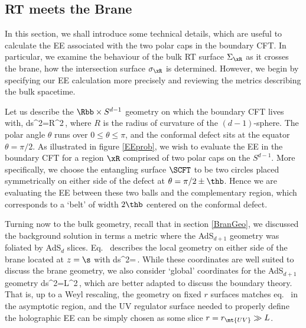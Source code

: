 \subsection{RT meets the Brane}
\label{sec:enzyme}
%
In this section, we shall introduce some technical details, which are useful to calculate the EE associated with the two polar caps in the boundary CFT. In particular, we examine the behaviour of the bulk RT surface $\Sigma_\xR$ as it crosses the brane, \ie how the intersection surface $\sigma_\xR$ is determined.
However, we begin by specifying our EE calculation more precisely and reviewing the metrics describing the bulk spacetime.

Let us describe the $\Rbb\times S^{d-1}$ geometry on which the boundary CFT lives with,
\beq\label{metricCFT}
ds^2=R^2\,,
\eeq
where $R$ is the radius of curvature of the $(d-1)$-sphere. The polar angle $\theta$ runs over $0\le\theta\le\pi$, and the conformal defect sits at the equator $\theta=\pi/2$. As illustrated in figure \ref{EEprob}, we wish to evaluate the EE in the boundary CFT for a region $\xR$ comprised of two polar caps on the $S^{d-1}$. More specifically, we choose the entangling surface $\SCFT$ to be two circles placed  symmetrically on either side of the defect at $\theta=\pi/2\pm\thb$. Hence we are evaluating the EE between these two balls and the complementary region, which corresponds to a `belt' of width $2\thb$ centered on the conformal defect.

Turning now to the bulk geometry, recall that in section \ref{BranGeo}, we discussed the background solution in terms a metric where the AdS$_{d+1}$ geometry was foliated by AdS$_d$ slices. Eq.~ describes the local geometry on either side of the brane
located at $z=\s$ with
\beq\label{metric3a}
ds^2=\,.
\eeq
While these coordinates are well suited to discuss the brane geometry, we also consider `global' coordinates for the AdS$_{d+1}$ geometry
\beq\label{metric2s}
ds^2=L^2\,,
\eeq
which are better adapted to discuss the boundary theory. That is, up to a Weyl rescaling, the geometry on fixed $r$ surfaces matches eq.~  in the asymptotic region, and the UV regulator surface needed to properly define the holographic EE can be simply chosen as some slice $r=r_\mt{UV}\gg L$.

